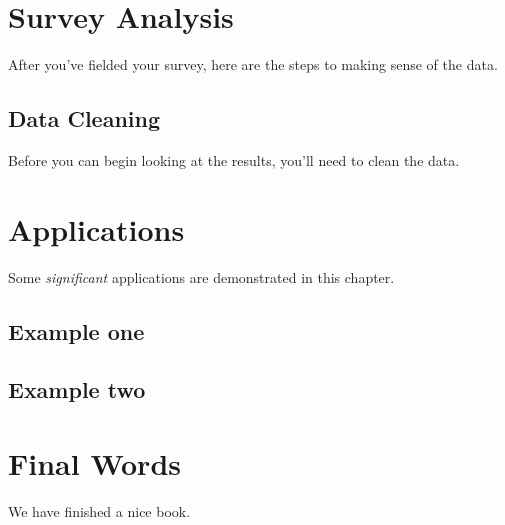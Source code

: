 \documentclass[]{book}
\begin{document}
\hypertarget{analysis}{%
\chapter{Survey Analysis}\label{analysis}}

After you've fielded your survey, here are the steps to making sense of the data.

\hypertarget{data-cleaning}{%
\section{Data Cleaning}\label{data-cleaning}}

Before you can begin looking at the results, you'll need to clean the data.

\hypertarget{applications}{%
\chapter{Applications}\label{applications}}

Some \emph{significant} applications are demonstrated in this chapter.

\hypertarget{example-one}{%
\section{Example one}\label{example-one}}

\hypertarget{example-two}{%
\section{Example two}\label{example-two}}

\hypertarget{final-words}{%
\chapter{Final Words}\label{final-words}}

We have finished a nice book.


\end{document}
